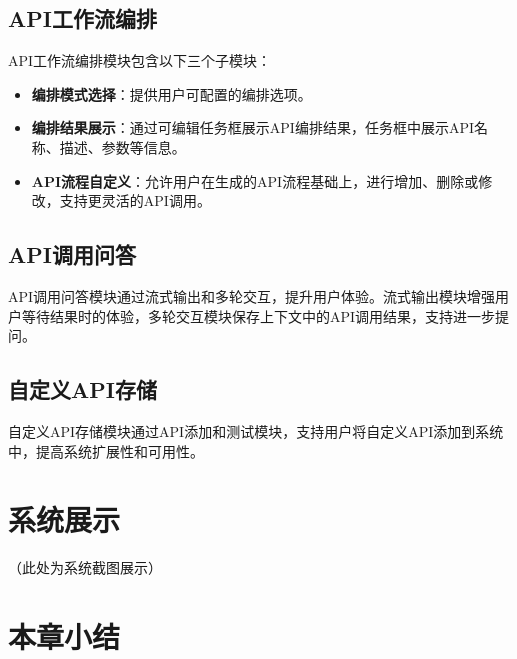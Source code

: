 \subsection{API工作流编排}
API工作流编排模块包含以下三个子模块：
\begin{itemize}
    \item \textbf{编排模式选择}：提供用户可配置的编排选项。
    \item \textbf{编排结果展示}：通过可编辑任务框展示API编排结果，任务框中展示API名称、描述、参数等信息。
    \item \textbf{API流程自定义}：允许用户在生成的API流程基础上，进行增加、删除或修改，支持更灵活的API调用。
\end{itemize}

\subsection{API调用问答}
API调用问答模块通过流式输出和多轮交互，提升用户体验。流式输出模块增强用户等待结果时的体验，多轮交互模块保存上下文中的API调用结果，支持进一步提问。

\subsection{自定义API存储}
自定义API存储模块通过API添加和测试模块，支持用户将自定义API添加到系统中，提高系统扩展性和可用性。

\section{系统展示}
（此处为系统截图展示）

\section{本章小结}